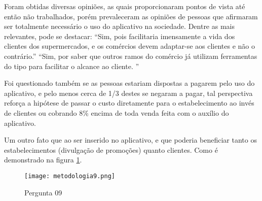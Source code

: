 Foram obtidas diversas opiniões, as quais proporcionaram pontos de vista até então não trabalhados, porém prevaleceram as opiniões de pessoas que afirmaram ser totalmente necessário o uso do aplicativo na sociedade. Dentre as mais relevantes, pode se destacar:
“Sim, pois facilitaria imensamente a vida dos clientes dos supermercados, e os comércios devem adaptar-se aos clientes e não o contrário.”
“Sim, por saber que outros ramos do comércio já utilizam ferramentas do tipo para facilitar o alcance ao cliente. ”

Foi questionado também se as pessoas estariam dispostas a pagarem pelo uso do aplicativo, e pelo menos cerca de 1/3 destes se negaram a pagar, tal perspectiva reforça a hipótese de passar o custo diretamente para o estabelecimento ao invés de clientes ou cobrando 8\% encima de toda venda feita com o auxílio do aplicativo.

Um outro fato que ao ser inserido no aplicativo, e que poderia beneficiar tanto os estabelecimentos (divulgação de promoções) quanto clientes. Como é demonstrado na figura \ref{fig:metodologia9}.

\begin{figure}[H]
    \centering
		\caption{Pergunta 09}
		\texttt{[image: metodologia9.png]}
		\label{fig:metodologia9}
\end{figure}




